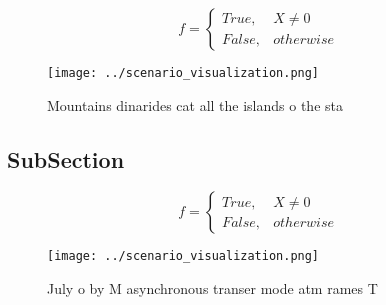 \documentclass[a4paper]{article}
\begin{document}
\begin{equation}   f =
\begin{cases} True, & X \neq 0\\
False, & otherwise
\end{cases}
\end{equation}

\begin{figure}
\centering
\texttt{[image: ../scenario\_visualization.png]}
\caption{Mountains dinarides cat all the islands o the sta
}
\end{figure}
 
\subsection{SubSection}

\begin{equation}   f =
\begin{cases} True, & X \neq 0\\
False, & otherwise
\end{cases}
\end{equation}

\begin{figure}
\centering
\texttt{[image: ../scenario\_visualization.png]}
\caption{July o by M asynchronous transer mode atm rames T
}
\end{figure}
 
\end{document}
